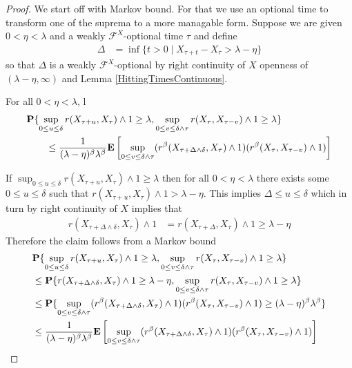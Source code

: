 \begin{proof}
We start off with Markov bound.  For that we use an optional time to transform one of the suprema to a more managable form.  
Suppose we are given $0 < \eta < \lambda$ and a weakly $\mathcal{F}^X$-optional time $\tau$ and define
\begin{align*}
\Delta &= \inf \lbrace t >0 \mid X_{\tau + t} - X_\tau > \lambda - \eta \rbrace
\end{align*}
so that $\Delta$ is a weakly $\mathcal{F}^X$-optional by right continuity of $X$ openness of $(\lambda-\eta,\infty)$ and Lemma \ref{HittingTimesContinuous}.  \begin{clm} For all $0 < \eta < \lambda$, l
\begin{align*}
&\textbf{P}\{\sup_{0 \leq u \leq \delta} r(X_{\tau + u}, X_\tau) \wedge 1 \geq \lambda, \sup_{0 \leq v \leq \delta \wedge \tau} r(X_{\tau}, X_{\tau-v}) \wedge 1 \geq \lambda\} \\
&\qquad \leq \frac{1}{(\lambda - \eta)^\beta \lambda^\beta} 
\textbf{E}\left[\sup_{0 \leq v \leq \delta \wedge \tau} (r^\beta(X_{\tau + \Delta \wedge \delta}, X_\tau) \wedge 1)(r^\beta(X_\tau, X_{\tau - v}) \wedge 1)\right]
\end{align*}
\end{clm}
If $\sup_{0 \leq u \leq \delta} r(X_{\tau + u}, X_\tau) \wedge 1 \geq \lambda$ then for all $0 < \eta < \lambda$ there exists some $0 \leq u \leq \delta$ such that
$r(X_{\tau + u}, X_\tau) \wedge 1 > \lambda - \eta$.  This implies $\Delta \leq u \leq \delta$ which in turn by right continuity of $X$ implies that 
\begin{align*}
r(X_{\tau + \Delta \wedge \delta}, X_\tau) \wedge 1 &= r(X_{\tau + \Delta}, X_\tau) \wedge 1 \geq \lambda - \eta
\end{align*}
Therefore the claim follows from a Markov bound
\begin{align*}
&\textbf{P}\{\sup_{0 \leq u \leq \delta} r(X_{\tau + u}, X_\tau) \wedge 1 \geq \lambda, \sup_{0 \leq v \leq \delta \wedge \tau} r(X_{\tau}, X_{\tau-v}) \wedge 1 \geq \lambda\} \\
&\leq \textbf{P}\{r(X_{\tau + \Delta \wedge \delta}, X_\tau) \wedge 1 \geq \lambda-\eta, \sup_{0 \leq v \leq \delta \wedge \tau} r(X_{\tau}, X_{\tau-v}) \wedge 1 \geq \lambda\} \\
&\leq \textbf{P}\{\sup_{0 \leq v \leq \delta \wedge \tau} (r^\beta(X_{\tau + \Delta \wedge \delta}, X_\tau) \wedge 1) (r^\beta(X_{\tau}, X_{\tau-v}) \wedge 1) \geq (\lambda-\eta)^\beta\lambda^\beta\} \\
&\leq \frac{1}{(\lambda - \eta)^\beta \lambda^\beta}  \textbf{E}\left[\sup_{0 \leq v \leq \delta \wedge \tau} (r^\beta(X_{\tau + \Delta \wedge \delta}, X_\tau) \wedge 1) (r^\beta(X_{\tau}, X_{\tau-v}) \wedge 1)\right]
\end{align*}


\end{proof}
